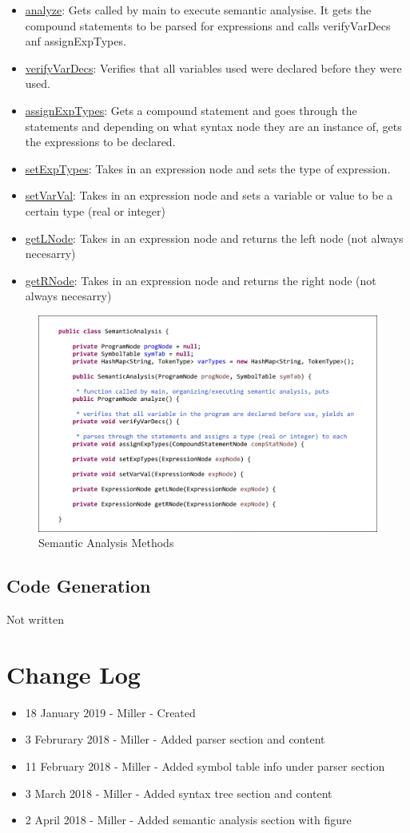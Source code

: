 \documentclass[english]{article}
\begin{document}
\begin{itemize}
\item
\underline{analyze}: Gets called by main to execute semantic analysise. It gets the compound statements  to be parsed for expressions and calls verifyVarDecs anf assignExpTypes. 
\item
\underline{verifyVarDecs}: Verifies that all variables used were declared before they were used.
\item
\underline{assignExpTypes}:  Gets a compound statement and goes through the statements and depending on what syntax node they are an instance of, gets the expressions to be declared.
\item
\underline{setExpTypes}: Takes in an expression node and sets the type of expression.
\item
\underline{setVarVal}: Takes in an expression node and sets a variable or value to be a certain type (real or integer)
\item
\underline{getLNode}: Takes in an expression node and returns the left node (not always necesarry)
\item
\underline{getRNode}: Takes in an expression node and returns the right node (not always necesarry)
\end{itemize}


\begin{figure}
\begin{center}
\includegraphics[width=1.1   extwidth]{semantic.PNG}
\end{center}
\caption{\label{Semantic}Semantic Analysis Methods}
\end{figure}




\subsection{Code Generation}

Not written



\par\addvspace{1cm}%
\section{Change Log}

\begin{itemize}
\item
18 January 2019 - Miller - Created
\item
3 Februrary 2018 - Miller - Added parser section and content
\item
11 February 2018 - Miller - Added symbol table info under parser section
\item
3 March 2018 - Miller - Added syntax tree section and content
\item
2 April 2018 - Miller - Added semantic analysis section with figure

\end{itemize}
\end{document}
